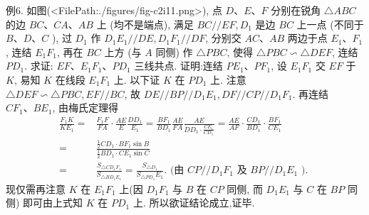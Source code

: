 例6. 如图(<FilePath:./figures/fig-c2i11.png>), 点 $D 、 E 、 F$ 分别在锐角 $\triangle A B C$ 的边 $B C 、 C A 、 A B$ 上 (均不是端点), 满足 $B C / / E F, D_1$ 是边 $B C$ 上一点 (不同于 $B 、 D 、 C$ ), 过 $D_1$ 作 $D_1 E_1 / / D E, D_1 F_1 / / D F$, 分别交 $A C 、 A B$ 两边于点 $E_1 、 F_1$, 连结 $E_1 F_1$, 再在 $B C$ 上方 (与 $A$ 同侧) 作 $\triangle P B C$, 使得 $\triangle P B C \backsim \triangle D E F$, 连结 $P D_1$. 求证: $E F 、 E_1 F_1 、 P D_1$ 三线共点.
证明:连结 $P E_1 、 P F_1$, 设 $E_1 F_1$ 交 $E F$ 于 $K$, 易知 $K$ 在线段 $E_1 F_1$ 上.
以下证 $K$ 在 $P D_1$ 上.
注意 $\triangle D E F \backsim \triangle P B C, E F / / B C$, 故 $D E / / B P / / D_1 E_1, D F / / C P / / D_1 F_1$.
再连结 $C F_1 、 B E_1$, 由梅氏定理得
$$
\begin{aligned}
\frac{F_1 K}{K E_1}= & \frac{F_1 F}{F A} \cdot \frac{A E}{E} \frac{D D_1}{E_1}=\frac{B F_1}{B D_1} \frac{A E}{F A} \frac{A E}{D D_1 \cdot \frac{C E_1}{C D_1}}=\frac{A E}{A F} \cdot \frac{C D_1}{B D_1} \cdot \frac{B F_1}{C E_1} \\
= & \frac{\frac{1}{2} C D_1 \cdot B F_1 \sin B}{\frac{1}{2} B D_1 \cdot C E_1 \sin C} \\
= & \frac{S_{\triangle C D_1 F_1}}{S_{\triangle B D_1 E_1}}=\frac{S_{\triangle D_1}}{S_{\triangle P D_1} E_1} \text {. (由 } C P / / D_1 F_1 \text { 及 } B P / / D_1 E_1 \text { ). }
\end{aligned}
$$
现仅需再注意 $K$ 在 $E_1 F_1$ 上(因 $D_1 F_1$ 与 $B$ 在 $C P$ 同侧, 而 $D_1 E_1$ 与 $C$ 在 $B P$ 同侧) 即可由上式知 $K$ 在 $P D_1$ 上.
所以欲证结论成立,证毕.



